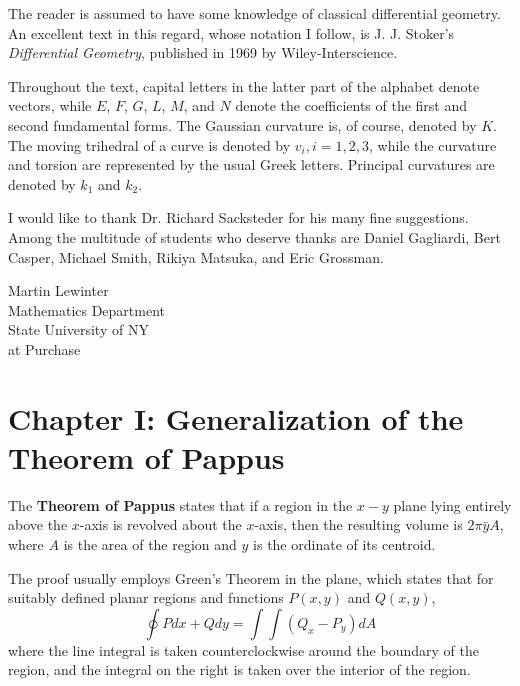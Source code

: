 \documentclass{book}
\begin{document}
The reader is assumed to have some knowledge of classical differential geometry. An excellent text in this regard, whose notation I follow, is J. J. Stoker's \emph{Differential Geometry}, published in 1969 by Wiley-Interscience.

Throughout the text, capital letters in the latter part of the alphabet denote vectors, while $E$, $F$, $G$, $L$, $M$, and $N$ denote the coefficients of the first and second fundamental forms. The Gaussian curvature is, of course, denoted by $K$. The moving trihedral of a curve is denoted by $v_{i}, i = 1, 2, 3$, while the curvature and torsion are represented by the usual Greek letters. Principal curvatures are denoted by $k_{1}$ and $k_{2}$.

I would like to thank Dr. Richard Sacksteder for his many fine suggestions. Among the multitude of students who deserve thanks are Daniel Gagliardi, Bert Casper, Michael Smith, Rikiya Matsuka, and Eric Grossman.

\begin{flushright}
Martin Lewinter \\
Mathematics Department \\
State University of NY \\
at Purchase
\end{flushright}


\chapter*{Chapter I: Generalization of the Theorem of Pappus}


\setcounter{equation}{0}

The \textbf{Theorem of Pappus} states that if a region in the $x-y$ plane lying entirely above the $x$-axis is revolved about the $x$-axis, then the resulting volume is $2 \pi \bar{y} A$, where $A$ is the area of the region and $y$ is the ordinate of its centroid.

The proof usually employs Green's Theorem in the plane, which states that for suitably defined planar regions and functions $P(x,y)$ and $Q(x,y)$,
\begin{equation}
\oint P dx + Q dy = \int \int (Q_{x} - P_{y}) dA
\end{equation}
where the line integral is taken counterclockwise around the boundary of the region, and the integral on the right is taken over the interior of the region.
\end{document}
